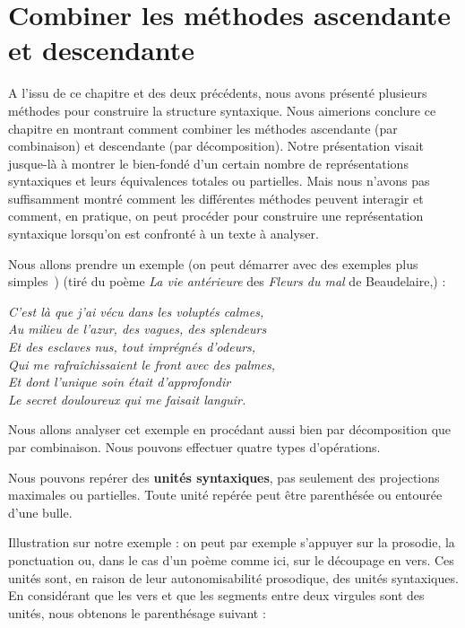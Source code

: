\section{Combiner les méthodes ascendante et descendante}\label{sec:3.4.27}

A l’issu de ce chapitre et des deux précédents, nous avons présenté plusieurs méthodes pour construire la structure syntaxique. Nous aimerions conclure ce chapitre en montrant comment combiner les méthodes ascendante (par combinaison) et descendante (par décomposition). Notre présentation visait jusque-là à montrer le bien-fondé d’un certain nombre de représentations syntaxiques et leurs équivalences totales ou partielles. Mais nous n’avons pas suffisamment montré comment les différentes méthodes peuvent interagir et comment, en pratique, on peut procéder pour construire une représentation syntaxique lorsqu’on est confronté à un texte à analyser.


Nous allons prendre un exemple (on peut démarrer avec des exemples plus simples~\HappySmiley) (tiré du poème \textit{La vie antérieure} des \textit{Fleurs du mal} de Beaudelaire,) :

\ea\label{ex:beaudelaire}
\itshape
C’est là que j’ai vécu dans les voluptés calmes,\\
Au milieu de l’azur, des vagues, des splendeurs\\
Et des esclaves nus, tout imprégnés d’odeurs,\\
Qui me rafraîchissaient le front avec des palmes,\\
Et dont l’unique soin était d’approfondir\\
Le secret douloureux qui me faisait languir.
\z

Nous allons analyser cet exemple en procédant aussi bien par décomposition que par combinaison. Nous pouvons effectuer quatre types d’opérations.

\begin{tblsframed}{}
\noindent Nous pouvons repérer des \textbf{unités syntaxiques}, pas seulement des projections maximales ou partielles. Toute unité repérée peut être parenthésée ou entourée d’une bulle.
\end{tblsframed}

Illustration sur notre exemple : on peut par exemple s’appuyer sur la prosodie, la ponctuation ou, dans le cas d’un poème comme ici, sur le découpage en vers. Ces unités sont, en raison de leur autonomisabilité prosodique, des unités syntaxiques. En considérant que les vers et que les segments entre deux virgules sont des unités, nous obtenons le parenthésage suivant :


